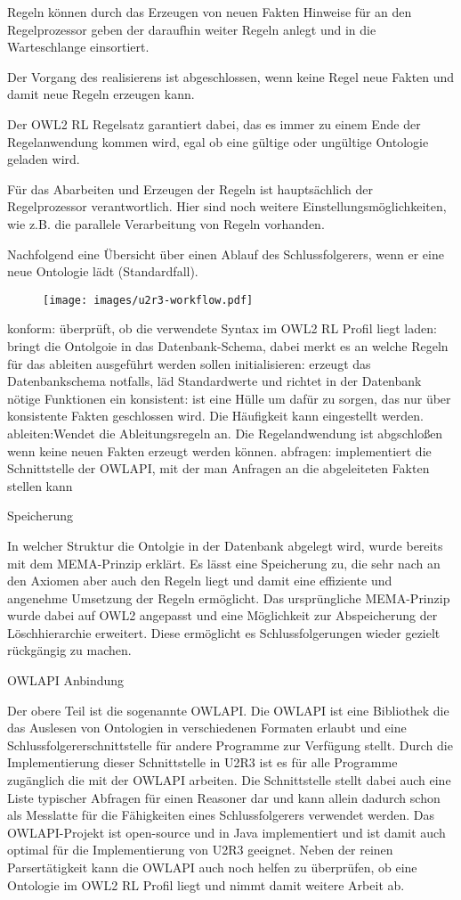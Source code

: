Regeln können durch das Erzeugen von neuen Fakten Hinweise für an den Regelprozessor geben der daraufhin weiter Regeln anlegt und in die Warteschlange einsortiert.

Der Vorgang des realisierens ist abgeschlossen, wenn keine Regel neue Fakten und damit neue Regeln erzeugen kann.

Der OWL2 RL Regelsatz garantiert dabei, das es immer zu einem Ende der Regelanwendung kommen wird, egal ob eine gültige oder ungültige Ontologie geladen wird.

Für das Abarbeiten und Erzeugen der Regeln ist hauptsächlich der Regelprozessor verantwortlich. Hier sind noch weitere Einstellungsmöglichkeiten, wie z.B. die parallele Verarbeitung von Regeln vorhanden.

Nachfolgend eine Übersicht über einen Ablauf des Schlussfolgerers, wenn er eine neue Ontologie lädt (Standardfall).

\begin{figure}
\texttt{[image: images/u2r3-workflow.pdf]}
\end{figure}
konform: überprüft, ob die verwendete Syntax im OWL2 RL Profil liegt
laden: bringt die Ontolgoie in das Datenbank-Schema, dabei merkt es an welche Regeln für das ableiten ausgeführt werden sollen
initialisieren: erzeugt das Datenbankschema notfalls, läd Standardwerte und richtet in der Datenbank nötige Funktionen ein
konsistent: ist eine Hülle um dafür zu sorgen, das nur über konsistente Fakten geschlossen wird. Die Häufigkeit kann eingestellt werden.
ableiten:Wendet die Ableitungsregeln an. Die Regelandwendung ist abgschloßen wenn keine neuen Fakten erzeugt werden können.
abfragen: implementiert die Schnittstelle der OWLAPI, mit der man Anfragen an die abgeleiteten Fakten stellen kann


Speicherung

In welcher Struktur die Ontolgie in der Datenbank abgelegt wird, wurde bereits mit dem MEMA-Prinzip erklärt. Es lässt eine Speicherung zu, die sehr nach an den Axiomen aber auch den Regeln liegt und damit eine effiziente und angenehme Umsetzung der Regeln ermöglicht. Das ursprüngliche MEMA-Prinzip wurde dabei auf OWL2 angepasst und eine Möglichkeit zur Abspeicherung der Löschhierarchie erweitert. Diese ermöglicht es Schlussfolgerungen wieder gezielt rückgängig zu machen.

OWLAPI Anbindung

Der obere Teil ist die sogenannte OWLAPI. Die OWLAPI ist eine Bibliothek die das Auslesen von Ontologien in verschiedenen Formaten erlaubt und eine Schlussfolgererschnittstelle für andere Programme zur Verfügung stellt. Durch die Implementierung dieser Schnittstelle in U2R3 ist es für alle Programme zugänglich die mit der OWLAPI arbeiten.
Die Schnittstelle stellt dabei auch eine Liste typischer Abfragen für einen Reasoner dar und kann allein dadurch schon als Messlatte für die Fähigkeiten eines Schlussfolgerers verwendet werden. Das OWLAPI-Projekt ist open-source und in Java implementiert und ist damit auch optimal für die Implementierung von U2R3 geeignet. Neben der reinen Parsertätigkeit kann die OWLAPI auch noch helfen zu überprüfen, ob eine Ontologie im OWL2 RL Profil liegt und nimmt damit weitere Arbeit ab.

